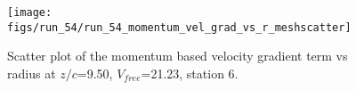 \begin{figure}[H]
\centering
\texttt{[image: figs/run\_54/run\_54\_momentum\_vel\_grad\_vs\_r\_meshscatter]}
\caption{Scatter plot of the momentum based velocity gradient term vs radius at $z/c$=9.50, $V_{free}$=21.23, station 6.}
\label{fig:run_54_momentum_vel_grad_vs_r_meshscatter}
\end{figure}


